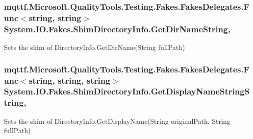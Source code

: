 \hypertarget{class_system_1_1_i_o_1_1_fakes_1_1_shim_directory_info_a80861d9d00b3d033445b9d7734c22f8e}{
\subsubsection[{Get\-Dir\-Name\-String}]{\setlength{\rightskip}{0pt plus 5cm}mqttf.\-Microsoft.\-Quality\-Tools.\-Testing.\-Fakes.\-Fakes\-Delegates.\-Func$<$string, string$>$ System.\-I\-O.\-Fakes.\-Shim\-Directory\-Info.\-Get\-Dir\-Name\-String\hspace{0.3cm}{\ttfamily [static]}, {\ttfamily [set]}}}\label{class_system_1_1_i_o_1_1_fakes_1_1_shim_directory_info_a80861d9d00b3d033445b9d7734c22f8e}


Sets the shim of Directory\-Info.\-Get\-Dir\-Name(\-String full\-Path)

\hypertarget{class_system_1_1_i_o_1_1_fakes_1_1_shim_directory_info_af73d2747811ea1a0e33ae0ca20ef2318}{
\subsubsection[{Get\-Display\-Name\-String\-String}]{\setlength{\rightskip}{0pt plus 5cm}mqttf.\-Microsoft.\-Quality\-Tools.\-Testing.\-Fakes.\-Fakes\-Delegates.\-Func$<$string, string, string$>$ System.\-I\-O.\-Fakes.\-Shim\-Directory\-Info.\-Get\-Display\-Name\-String\-String\hspace{0.3cm}{\ttfamily [static]}, {\ttfamily [set]}}}\label{class_system_1_1_i_o_1_1_fakes_1_1_shim_directory_info_af73d2747811ea1a0e33ae0ca20ef2318}


Sets the shim of Directory\-Info.\-Get\-Display\-Name(\-String original\-Path, String full\-Path)

